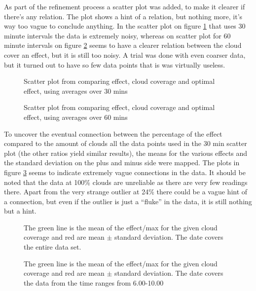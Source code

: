 As part of the refinement process a scatter plot was added, to make it
clearer if there's any relation.  The plot shows a hint of a relation,
but nothing more, it's way too vague to conclude anything.  In the
scatter plot on figure \ref{fig:scatter30} that uses 30 minute
intervals the data is extremely noisy, whereas on scatter plot for 60
minute intervals on figure \ref{fig:scatter60} seems to have a clearer
relation between the cloud cover an effect, but it is still too noisy.
A trial was done with even coarser data, but it turned out to have so
few data points that is was virtually useless.

\begin{figure}
  \centering
  \tiny
  
  \caption{Scatter plot from comparing effect, cloud coverage and
    optimal effect, using averages over 30 mins}
  \label{fig:scatter30}
\end{figure}

\begin{figure}
  \centering
      \tiny
      
  \caption{Scatter plot from comparing effect, cloud coverage and
    optimal effect, using averages over 60 mins}
  \label{fig:scatter60}
\end{figure}

To uncover the eventual connection between the percentage of the
effect compared to the amount of clouds all the data points used in
the 30 min scatter plot (the other ratios yield similar results),
the means for the various effects and the standard deviation on the
plus and minus side were mapped.  The plots in figure
\ref{fig:stattotal} seems to indicate extremely vague connections in
the data.  It should be noted that the data at 100\% clouds are
unreliable as there are very few readings there.  Apart from the very
strange outlier at 24\% there could be a vague hint of a connection,
but even if the outlier is just a ``fluke'' in the data, it is still
nothing but a hint.

\begin{figure}
  \centering
  \tiny
  
  \caption{The green line is the mean of the effect/max for the given
    cloud coverage and red are mean $\pm$ standard deviation.  The
    date covers the entire data set.}
  \label{fig:stattotal}
\end{figure}

\begin{figure}
  \centering
  \tiny
  
  \caption{The green line is the mean of the effect/max for the given
    cloud coverage and red are mean $\pm$ standard deviation.  The
    date covers the data from the time ranges from 6.00-10.00}
  \label{fig:stat0610}
\end{figure}

